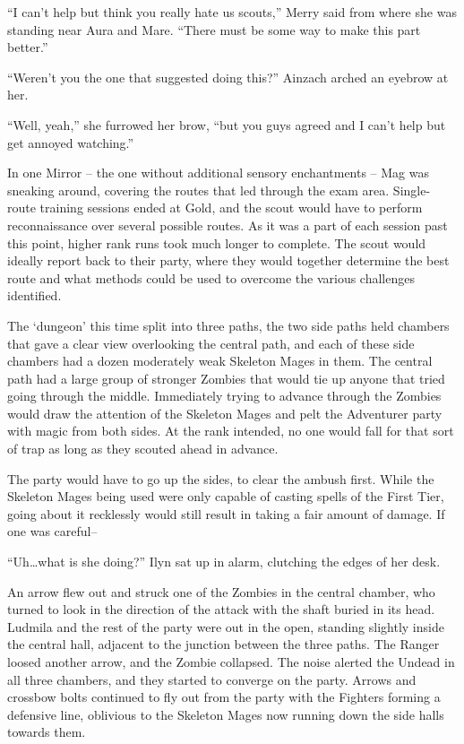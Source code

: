 “I can’t help but think you really hate us scouts,” Merry said from where she was standing near Aura and Mare. “There must be some way to make this part better.”

 

“Weren’t you the one that suggested doing this?” Ainzach arched an eyebrow at her.

 

“Well, yeah,” she furrowed her brow, “but you guys agreed and I can’t help but get annoyed watching.”

 

In one Mirror – the one without additional sensory enchantments – Mag was sneaking around, covering the routes that led through the exam area. Single-route training sessions ended at Gold, and the scout would have to perform reconnaissance over several possible routes. As it was a part of each session past this point, higher rank runs took much longer to complete. The scout would ideally report back to their party, where they would together determine the best route and what methods could be used to overcome the various challenges identified.

 

The ‘dungeon’ this time split into three paths, the two side paths held chambers that gave a clear view overlooking the central path, and each of these side chambers had a dozen moderately weak Skeleton Mages in them. The central path had a large group of stronger Zombies that would tie up anyone that tried going through the middle. Immediately trying to advance through the Zombies would draw the attention of the Skeleton Mages and pelt the Adventurer party with magic from both sides. At the rank intended, no one would fall for that sort of trap as long as they scouted ahead in advance.

 

The party would have to go up the sides, to clear the ambush first. While the Skeleton Mages being used were only capable of casting spells of the First Tier, going about it recklessly would still result in taking a fair amount of damage. If one was careful–

 

“Uh…what is she doing?” Ilyn sat up in alarm, clutching the edges of her desk.

 

An arrow flew out and struck one of the Zombies in the central chamber, who turned to look in the direction of the attack with the shaft buried in its head. Ludmila and the rest of the party were out in the open, standing slightly inside the central hall, adjacent to the junction between the three paths. The Ranger loosed another arrow, and the Zombie collapsed. The noise alerted the Undead in all three chambers, and they started to converge on the party. Arrows and crossbow bolts continued to fly out from the party with the Fighters forming a defensive line, oblivious to the Skeleton Mages now running down the side halls towards them.

